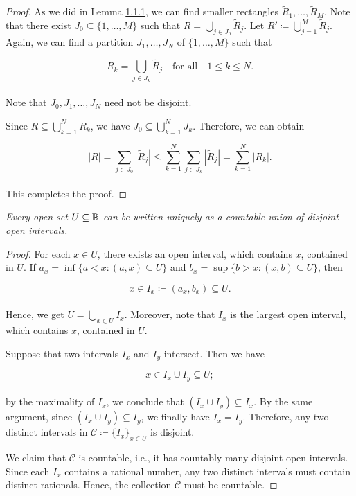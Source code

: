 \documentclass[12pt, a4paper, openany, twoside]{book}
\theoremstyle{definition}
\theoremstyle{remark}
\theoremstyle{plain}
\numberwithin{equation}{section}
\begin{document}
\begin{proof}
    As we did in Lemma \hyperref[Lemma 1.1.1]{1.1.1}, we can find smaller rectangles $\tilde{R}_1,\dots,\tilde{R}_M$. Note that there exist $J_0\subseteq\{1,\dots, M\}$ such that $R=\bigcup_{j\in J_0}{\tilde{R}_j}$. Let $R'\coloneqq\bigcup_{j=1}^{M}{\tilde{R}_j}$. Again, we can find a partition $J_1,\dots, J_N$ of $\{1,\dots, M\}$ such that 

    \[R_k=\bigcup_{j\in J_k}{\tilde{R}_j}\quad\text{for all}\quad 1\leq k\leq N.\]
    \\
    Note that $J_0, J_1,\dots, J_N$ need not be disjoint. 
    
    Since $R\subseteq\bigcup_{k=1}^{N}{R_k}$, we have $J_0\subseteq\bigcup_{k=1}^{N}{J_k}$. Therefore, we can obtain

    \[|R|=\sum_{j\in J_0}{|\tilde{R}_j|}\leq \sum_{k=1}^{N}{\sum_{j\in J_k}{|\tilde{R}_j|}}=\sum_{k=1}^{N}{|R_k|}.\]
    \\
    This completes the proof.
\end{proof}
\vspace{5mm}
\begin{tcolorbox}[colback=yellow!10!white,colframe=red!75!black,title=Theorem 1.1.3]\label{Theorem 1.1.3}
    \emph{Every open set $U\subseteq{\mathbb {R}}$ can be written uniquely as a countable union of disjoint open intervals.}
\end{tcolorbox}
\begin{proof}
    For each $x\in U$, there exists an open interval, which contains $x$, contained in $U$. If $a_x=\inf\{a<x:(a,x)\subseteq U\}$ and $b_x=\sup\{b>x:(x,b)\subseteq U\}$, then 

    \[x\in I_x\coloneqq(a_x,b_x)\subseteq U.\]
    \\
    Hence, we get $U=\bigcup_{x\in U}{I_x}$. Moreover, note that $I_x$ is the largest open interval, which contains $x$, contained in $U$. 

    Suppose that two intervals $I_x$ and $I_y$ intersect. Then we have

    \[x\in I_x\cup I_y\subseteq U;\]
    \\
    by the maximality of $I_x$, we conclude that $(I_x\cup I_y)\subseteq I_x$. By the same argument, since $(I_x\cup I_y)\subseteq I_y$, we finally have $I_x=I_y$. Therefore, any two distinct intervals in $\mathcal{C}\coloneqq\{I_x\}_{x\in U}$ is disjoint.

    We claim that $\mathcal{C}$ is countable, i.e., it has countably many disjoint open intervals. Since each $I_x$ contains a rational number, any two distinct intervals must contain distinct rationals. Hence, the collection $\mathcal{C}$ must be countable.
\end{proof}
\vspace{5mm}
\end{document}

